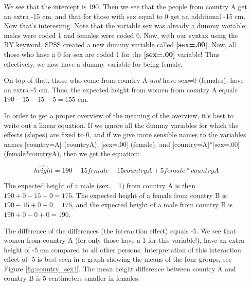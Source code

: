 \documentclass[]{book}\usepackage[]{graphicx}\usepackage[]{color}
\begin{document}
We see that the intercept is 190. Then we see that the people from country A get an extra -15 cm, and that for those with sex equal to 0 get an additional -15 cm. Now that's interesting. Note that the variable sex was already a dummy variable: males were coded 1 and females were coded 0. Now, with our syntax using the BY keyword, SPSS created a new dummy variable called \textbf{[sex=.00]}. Now, all those who have a 0 for sex are coded 1 for the \textbf{[sex=.00]} variable! Thus effectively, we now have a dummy variable for being female. 

On top of that, those who come from country A \textit{and} have sex=0 (females), have an extra -5 cm. Thus, the expected height from women from country A equals $190-15-15-5=155$ cm. 

In order to get a proper overview of the meaning of the overview, it's best to write out a linear equation. If we ignore all the dummy variables for which the effects (slopes) are fixed to 0, and if we give more sensible names to the variables names [country=A] (countryA), [sex=.00] (female), and [country=A]*[sex=.00] (female*countryA), then we get the equation:

\begin{equation}
\widehat{height}= 190  - 15 female - 15 countryA + 5 female*countryA
\end{equation}


The expected height of a male (sex = 1) from country A is then $190  + 0 - 15 + 0 = 175$. The expected height of a female from country B is $190 -15 + 0 +0 =175$, and the expected height of a male from country B is $190 + 0 + 0 + 0 = 190$. 

The difference of the differences (the interaction effect) equals -5. We see that women from country A (for only those have a 1 for this variable!), have an extra height of -5 cm compared to all other persons. Interpretation of this interaction effect of -5 is best seen in a graph showing the means of the four groups, see Figure \ref{fig:country_sex1}. The mean height difference between country A and country B is 5 centimeters smaller in females.
\end{document}
